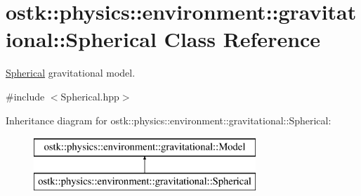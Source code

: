 \hypertarget{classostk_1_1physics_1_1environment_1_1gravitational_1_1_spherical}{}\section{ostk\+:\+:physics\+:\+:environment\+:\+:gravitational\+:\+:Spherical Class Reference}
\label{classostk_1_1physics_1_1environment_1_1gravitational_1_1_spherical}


\hyperlink{classostk_1_1physics_1_1environment_1_1gravitational_1_1_spherical}{Spherical} gravitational model.  




{\ttfamily \#include $<$Spherical.\+hpp$>$}

Inheritance diagram for ostk\+:\+:physics\+:\+:environment\+:\+:gravitational\+:\+:Spherical\+:\begin{figure}[H]
\begin{center}
\leavevmode
\includegraphics[height=2.000000cm]{classostk_1_1physics_1_1environment_1_1gravitational_1_1_spherical}
\end{center}
\end{figure}
